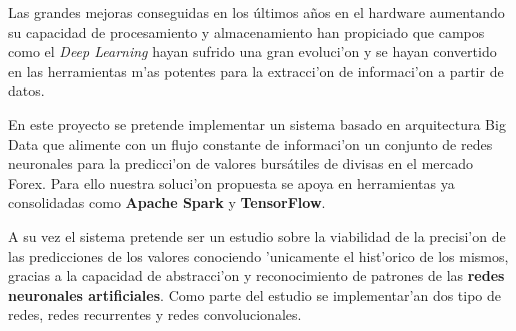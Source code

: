 
Las grandes mejoras conseguidas en los últimos años en el hardware aumentando su capacidad de procesamiento y almacenamiento han propiciado que campos como el \emph{Deep Learning} hayan sufrido una gran evoluci'on y se hayan convertido en las herramientas m'as potentes para la extracci'on de informaci'on a partir de datos. 

En este proyecto se pretende implementar un sistema basado en arquitectura Big Data que alimente con un flujo constante de informaci'on un conjunto de redes neuronales para la predicci'on de valores bursátiles de divisas en el mercado Forex. Para ello nuestra soluci'on propuesta se apoya en herramientas ya consolidadas como \textbf{Apache Spark} y \textbf{TensorFlow}.

A su vez el sistema pretende ser un estudio sobre la viabilidad de la precisi'on de las predicciones de los valores conociendo 'unicamente el hist'orico de los mismos, gracias a la capacidad de abstracci'on y reconocimiento de patrones de las \textbf{redes neuronales artificiales}. Como parte del estudio se implementar'an dos tipo de redes, redes recurrentes y redes convolucionales.



